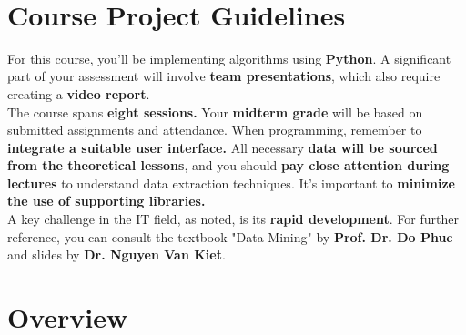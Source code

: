 

\newcommand{\tab}{\hspace{\parindent}}
\newcommand{\TextBox}[4]{
    \draw (#1,#2) node[anchor=south west,node font=\normalsize] {#3};
    \draw[rounded corners=0.2cm,black] (#1-0.3,#2+0.8) rectangle (#1+#4,#2); 
}

\begin{titlepage}
\bordertitle
\begin{center}
\vspace{\fill} \maintitle \\ \vspace{\fill} \bottitle
\end{center}
\end{titlepage}
\newpage
{}
\tableofcontents
\thispagestyle{empty}
\newpage
\chapter*{ Course Project Guidelines }
\thispagestyle{empty}
\vspace{\fill}
For this course, you'll be implementing algorithms using \textbf{Python}. A significant part of your assessment will involve \textbf{team presentations}, which also require creating a \textbf{video report}.\\
The course spans \textbf{eight sessions.} Your \textbf{midterm grade} will be based on submitted assignments and attendance. When programming, remember to \textbf{integrate a suitable user interface.} All necessary \textbf{data will be sourced from the theoretical lessons}, and you should \textbf{pay close attention during lectures} to understand data extraction techniques. It's important to \textbf{minimize the use of supporting libraries.}\\
A key challenge in the IT field, as noted, is its \textbf{rapid development}. For further reference, you can consult the textbook "Data Mining" by \textbf{Prof. Dr. Do Phuc} and slides by \textbf{Dr. Nguyen Van Kiet}.
\vspace{\fill}
\newpage
\setcounter{page}{1}
\chapter{ Overview }
